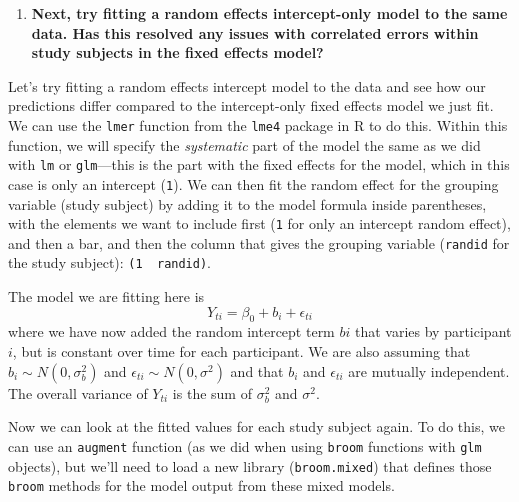 \documentclass[
]{book}
\newenvironment{Shaded}{\begin{snugshade}}{\end{snugshade}}
\newcommand{\DataTypeTok}[1]{\textcolor[rgb]{0.13,0.29,0.53}{#1}}
\newcommand{\DecValTok}[1]{\textcolor[rgb]{0.00,0.00,0.81}{#1}}
\newcommand{\KeywordTok}[1]{\textcolor[rgb]{0.13,0.29,0.53}{\textbf{#1}}}
\newcommand{\NormalTok}[1]{#1}
\newcommand{\OperatorTok}[1]{\textcolor[rgb]{0.81,0.36,0.00}{\textbf{#1}}}
\newcommand{\StringTok}[1]{\textcolor[rgb]{0.31,0.60,0.02}{#1}}
\providecommand{\tightlist}{%
  \setlength{\itemsep}{0pt}\setlength{\parskip}{0pt}}
\begin{document}
\begin{enumerate}
\def\labelenumi{\arabic{enumi}.}
\setcounter{enumi}{1}
\tightlist
\item
  \textbf{Next, try fitting a random effects intercept-only model to the same data. Has this resolved any issues with correlated errors within study subjects in the fixed effects model?}
\end{enumerate}

Let's try fitting a random effects intercept model to the data and see how our
predictions differ compared to the intercept-only fixed effects model we just fit.
We can use the \texttt{lmer} function from the \texttt{lme4} package in R to do this. Within
this function, we will specify the \emph{systematic} part of the model the same as
we did with \texttt{lm} or \texttt{glm}---this is the part with the fixed effects for the model,
which in this case is only an intercept (\texttt{1}). We can then fit the random
effect for the grouping variable (study subject) by adding it to the model formula
inside parentheses, with the elements we want to include first (\texttt{1} for only
an intercept random effect), and then a bar, and then the column that gives
the grouping variable (\texttt{randid} for the study subject): \texttt{(1\ \textbar{}\ randid)}.

\begin{Shaded}
\end{Shaded}

The model we are fitting here is
\[
Y_{ti} = \beta_{0} + b_{i} + \epsilon_{ti}
\]
where we have now added the random intercept term \(b{i}\) that varies by participant
\(i\), but is constant over time for each participant. We are also assuming that
\(b_{i} \sim N(0,\sigma_{b}^2)\) and \(\epsilon_{ti} \sim N(0,\sigma^2)\) and that \(b_{i}\)
and \(\epsilon_{ti}\) are mutually independent. The overall variance of \(Y_{ti}\) is
the sum of \(\sigma_{b}^2\) and \(\sigma^2\).

Now we can look at the fitted values for each study subject again. To do this,
we can use an \texttt{augment} function (as we did when using \texttt{broom} functions with
\texttt{glm} objects), but we'll need to load a new library (\texttt{broom.mixed}) that defines
those \texttt{broom} methods for the model output from these mixed models.
\end{document}
